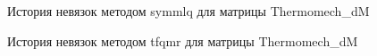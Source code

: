 \begin{figure}[H]
    \renewcommand{\figurename}{Рисунок}
    \caption{История невязок методом symmlq для матрицы Thermomech\_dM}
    \label{fig:image_31}
\end{figure}

\begin{figure}[H]
    \renewcommand{\figurename}{Рисунок}
    \caption{История невязок методом tfqmr для матрицы Thermomech\_dM}
    \label{fig:image_32}
\end{figure}